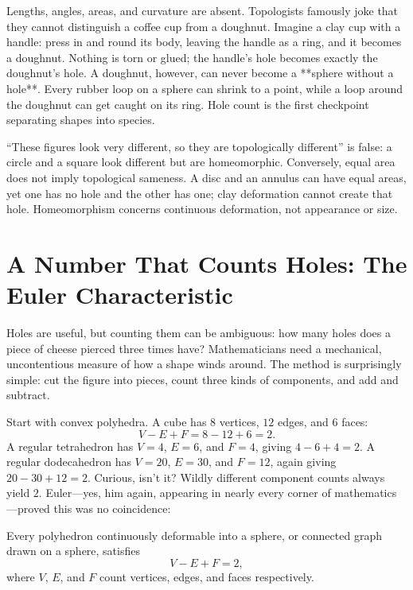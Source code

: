 Lengths, angles, areas, and curvature are absent. Topologists famously joke that they cannot distinguish a coffee cup from a doughnut. Imagine a clay cup with a handle: press in and round its body, leaving the handle as a ring, and it becomes a doughnut. Nothing is torn or glued; the handle's hole becomes exactly the doughnut's hole. A doughnut, however, can never become a **sphere without a hole**. Every rubber loop on a sphere can shrink to a point, while a loop around the doughnut can get caught on its ring. Hole count is the first checkpoint separating shapes into species.

\begin{fanli}
``These figures look very different, so they are topologically different'' is false: a circle and a square look different but are homeomorphic. Conversely, equal area does not imply topological sameness. A disc and an annulus can have equal areas, yet one has no hole and the other has one; clay deformation cannot create that hole. Homeomorphism concerns continuous deformation, not appearance or size.
\end{fanli}

\section{A Number That Counts Holes: The Euler Characteristic}

Holes are useful, but counting them can be ambiguous: how many holes does a piece of cheese pierced three times have? Mathematicians need a mechanical, uncontentious measure of how a shape winds around. The method is surprisingly simple: cut the figure into pieces, count three kinds of components, and add and subtract.

Start with convex polyhedra. A cube has $8$ vertices, $12$ edges, and $6$ faces:
\[
V - E + F = 8 - 12 + 6 = 2.
\]
A regular tetrahedron has $V=4$, $E=6$, and $F=4$, giving $4-6+4=2$. A regular dodecahedron has $V=20$, $E=30$, and $F=12$, again giving $20-30+12=2$. Curious, isn't it? Wildly different component counts always yield $2$. Euler---yes, him again, appearing in nearly every corner of mathematics---proved this was no coincidence:

\begin{dingli}
Every polyhedron continuously deformable into a sphere, or connected graph drawn on a sphere, satisfies
\[
V - E + F = 2,
\]
where $V$, $E$, and $F$ count vertices, edges, and faces respectively.
\end{dingli}

